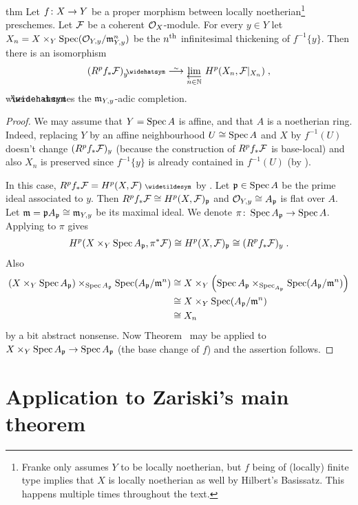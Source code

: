 \documentclass[a4paper,parskip=half,numbers=enddot, DIV=12]{scrreprt}
\begin{document}
\begin{varthm}{thm}
	Let $f\colon X\morphism Y$ be a proper morphism between locally noetherian\footnote{Franke only assumes $Y$ to be locally noetherian, but $f$ being of (locally) finite type implies that $X$ is locally noetherian as well by Hilbert's Basissatz. This happens multiple times throughout the text.} preschemes. Let $\mathcal{F}$ be a coherent $\mathcal{O}_X$-module. For every $y\in Y$ let $X_n=X\times_Y\operatorname{Spec} (\mathcal{O}_{Y,y}/\mathfrak{m}_{Y,y}^n)$ be the $n^{\text{th}}$ infinitesimal thickening of $f^{-1}\{y\}$. Then there is an isomorphism
	\begin{align*}
		(R^pf_*\Ff)_y^\complete\isomorphism\limit[n\in\IN] H^p(X_n,\Ff|_{X_n})\;,
	\end{align*}
	where $\roof{\phantom{x}}$ denotes the $\mathfrak{m}_{Y,y}$-adic completion.
\end{varthm}
\begin{proof}
	We may assume that $Y=\operatorname{Spec} A$ is affine, and that $A$ is a noetherian ring. Indeed, replacing $Y$ by an affine neighbourhood $U\cong \operatorname{Spec} A$ and $X$ by $f^{-1}(U)$ doesn't change $(R^pf_*\mathcal{F})_y$ (because the construction of $R^pf_*\mathcal{F}$ is base-local) and also $X_n$ is preserved since $f^{-1}\{y\}$ is already contained in $f^{-1}(U)$ (by \cite[postnote]{alggeo2}).
	
	In this case, $R^pf_*\Ff=H^p(X,\Ff)^\qcmod$ by \cite[Proposition~1.5.1]{alggeo2}. Let $\mathfrak{p}\in\operatorname{Spec} A$ be the prime ideal associated to $y$. Then $R^pf_*\mathcal{F}\cong H^p(X,\mathcal{F})_{\mathfrak{p}}$ and $\mathcal{O}_{Y,y}\cong A_{\mathfrak{p}}$ is flat over $A$. Let $\mathfrak{m}=\mathfrak{p} A_{\mathfrak{p}}\cong \mathfrak{m}_{Y,y}$ be its maximal ideal. We denote $\pi\colon \Spec A_\pp\morphism \Spec A$. Applying \cite[Fact~4.1.1]{alggeo2} to $\pi$ gives 
	\begin{align*}
		H^p(X\times_Y\operatorname{Spec} A_{\mathfrak{p}},\pi^*\mathcal{F})\cong H^p(X,\mathcal{F})_{\mathfrak{p}}\cong (R^pf_*\mathcal{F})_y\;.
	\end{align*}
	Also
	\begin{align*}
		\left(X\times_Y\operatorname{Spec} A_{\mathfrak{p}}\right)\times_{\operatorname{Spec} A_{\mathfrak{p}}}\operatorname{Spec}(A_{\mathfrak{p}}/\mathfrak{m}^n)&\cong X\times_Y\left(\operatorname{Spec} A_{\mathfrak{p}}\times_{\operatorname{Spec}_{A_{\mathfrak{p}}}}\operatorname{Spec} (A_{\mathfrak{p}}/\mathfrak{m}^n)\right)\\
		&\cong X\times_Y\operatorname{Spec}(A_{\mathfrak{p}}/\mathfrak{m}^n)\\
		&\cong X_n
	\end{align*}
	by a bit abstract nonsense. Now Theorem~ may be applied to $X\times_Y\Spec A_\pp\morphism \Spec A_\pp$ (the base change of $f$) and the assertion follows.
\end{proof}
\section{Application to Zariski's main theorem}
\end{document}
